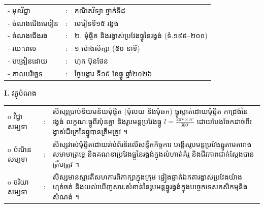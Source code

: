 \documentclass[a4paper,10pt]{article}
\newcommand{\wcirc}{{\CourierBullet\fontsize{9.5pt}{11pt}\selectfont o}}
\begin{document}
{\renewcommand{\arraystretch}{0.95}
\hspace*{4.05cm}%
\begin{tabular}{@{}l l l@{}}
  - \hspace{0.35cm} មុខវិជ្ជា & : & គណិតវិទ្យា ថ្នាក់ទី៨ \\
  - \hspace{0.35cm} ចំណងជើងមេរៀន & : & មេរៀនទី១៥ រង្វង់ \\
  - \hspace{0.35cm} ចំណងជើងរង & : & ២. មុំផ្ចិត និងរង្វាស់ប្រវែងធ្នូនៃរង្វង់ (ទំ.១៩៩--២០០) \\
  - \hspace{0.35cm} រយៈពេល & : & ១ ម៉ោងសិក្សា (៥០ នាទី) \\
  - \hspace{0.35cm} បង្រៀនដោយ & : & ហុក ប៊ុនថែន \\
  - \hspace{0.35cm} កាលបរិច្ឆេទ & : & ថ្ងៃអង្គារ ទី១៥ ខែធ្នូ ឆ្នាំ២០២៦ \\
\end{tabular}

\vspace{1pt}

\textbf{I.} {\muol វត្ថុបំណង}\\[1pt]
\hspace*{0.55cm}%
\begin{tabular}{@{}l l L{14.2cm}@{}}
  \wcirc \hspace{0.25cm} វិជ្ជាសម្បទា & : & សិស្សប្រាប់និយមន័យមុំផ្ចិត (មុំលយ និងមុំឆក) ធ្នូស្កាត់ដោយមុំផ្ចិត កាដ្រង់នៃរង្វង់ លក្ខណៈធ្នូពីរប៉ុនគ្នា និងរូបមន្តប្រវែងធ្នូ $l = \frac{2\pi r \times n^\circ}{360^\circ}$ ដោយបែងចែកដាច់ពីរង្វាស់ដឺក្រេនៃធ្នូបានត្រឹមត្រូវ ។ \\
  \wcirc \hspace{0.25cm} បំណិនសម្បទា & : & សិស្សវាស់មុំផ្ចិតដោយរ៉ាប់ព័រទ័រលើសន្លឹកកិច្ចការ បង្កើតរូបមន្តប្រវែងធ្នូតាមតារាងសមាមាត្រទ្វេ និងគណនាប្រវែងធ្នូនៃរង្វង់ក្នុងលំហាត់គំរូ និងជីវភាពជាក់ស្ដែងបានត្រឹមត្រូវ ។ \\
  \wcirc \hspace{0.25cm} ចរិយាសម្បទា & : & សិស្សមានស្មារតីសហការពិភាក្សាក្នុងក្រុម ផ្ទៀងផ្ទាត់ឯកតារង្វាស់ប្រវែងយ៉ាងហ្មត់ចត់ និងយល់ឃើញសារៈសំខាន់នៃរូបមន្តធ្នូរង្វង់ក្នុងបច្ចេកទេសកសិកម្មនិងសំណង់ ។ \\
\end{tabular}

\vspace{1pt}

}
\end{document}
